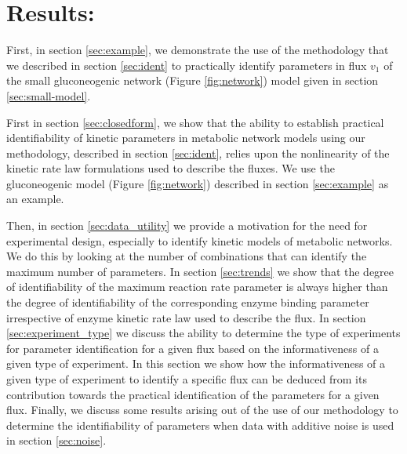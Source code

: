 \documentclass[10pt]{article}
\begin{document}
	\section{Results:}
	First, in section \ref{sec:example}, we demonstrate the use of the methodology that we described in section \ref{sec:ident} to practically identify parameters in flux $v_1$ of the small gluconeogenic network (Figure \ref{fig:network}) model given in section \ref{sec:small-model}.
	
	First in section \ref{sec:closedform}, we show that the ability to establish practical identifiability of kinetic parameters in metabolic network models using our methodology, described in section \ref{sec:ident}, relies upon the nonlinearity of the kinetic rate law formulations used to describe the fluxes. We use the gluconeogenic model (Figure \ref{fig:network}) described in section \ref{sec:example} as an example. 
	
	
	Then, in section \ref{sec:data_utility} we provide a motivation for the need for experimental design, especially to identify kinetic models of metabolic networks. We do this by looking at the number of combinations that can identify the maximum number of parameters. 
	In section \ref{sec:trends} we show that the degree of identifiability of the maximum reaction rate parameter is always higher than the degree of identifiability of the corresponding enzyme binding parameter irrespective of enzyme kinetic rate law used to describe the flux. 
	In section \ref{sec:experiment_type} we discuss the ability to determine the type of experiments for parameter identification for a given flux based on the informativeness of a given type of experiment. In this section we show how the informativeness of a given type of experiment to identify a specific flux can be deduced from its contribution towards the practical identification of the parameters for a given flux. Finally, we discuss some results arising out of the use of our methodology to determine the identifiability of parameters when data with additive noise is used in section \ref{sec:noise}.
	
\end{document}
